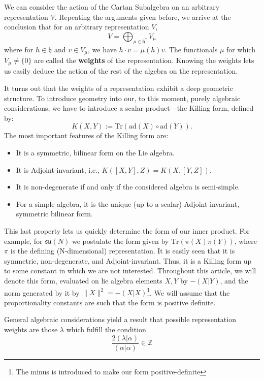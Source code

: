 \documentclass[11pt, a4paper]{article}
\newcommand{\su}{\mathfrak{su}}
\theoremstyle{definition}
\theoremstyle{remark}
\begin{document}
We can consider the action of the Cartan Subalgebra on an arbitrary representation $V$. Repeating the arguments given before, we arrive at the conclusion that for an arbitrary representation $V$,
\[
V = \bigoplus_{\mu \in \mathfrak{h}^*} V_\mu
\]
where for $h \in \mathfrak{h}$ and $v \in V_\mu$, we have $h \cdot v = \mu(h)v$. The functionals $\mu$ for which $V_\mu \neq \{0\}$ are called the \textbf{weights} of the representation. Knowing the weights lets us easily deduce the action of the rest of the algebra on the representation.

It turns out that the weights of a representation exhibit a deep geometric structure. To introduce geometry into our, to this moment, purely algebraic considerations, we have to introduce a scalar product—the Killing form, defined by:
\[
K(X,Y) := \mathrm{Tr}(\mathrm{ad}(X) \circ \mathrm{ad}(Y)).
\]
The most important features of the Killing form are:
\begin{itemize}
    \item It is a symmetric, bilinear form on the Lie algebra.
    \item It is Adjoint-invariant, i.e., $K([X,Y],Z) = K(X,[Y,Z])$.
    \item It is non-degenerate if and only if the considered algebra is semi-simple.
    \item For a simple algebra, it is the unique (up to a scalar) Adjoint-invariant, symmetric bilinear form.
\end{itemize}
This last property lets us quickly determine the form of our inner product. For example, for $\su(N)$ we postulate the form given by $\mathrm{Tr}(\pi(X)\pi(Y))$, where $\pi$ is the defining (N-dimensional) representation. It is easily seen that it is symmetric, non-degenerate, and Adjoint-invariant. Thus, it is a Killing form up to some constant in which we are not interested. Throughout this article, we will denote this form, evaluated on lie algebra elements $X,Y$ by $-(X|Y)$, and the norm generated by it by $\|X\|^2 = -(X|X)$\footnote{The minus is introduced to make our form positive-definite}. We will assume that the proportionality constants are such that the form is positive definite.

General algebraic considerations yield a result that possible representation weights are those $\lambda$ which fulfill the condition
\begin{equation}
    \label{eq:intcond}
    \frac{2 (\lambda|\alpha)}{(\alpha|\alpha)} \in \mathbb{Z}
\end{equation}
\end{document}
